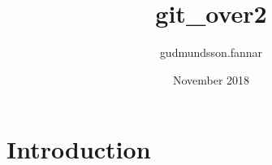 \documentclass{article}
\title{git_over2}
\author{gudmundsson.fannar }
\date{November 2018}
\begin{document}
\maketitle

\section{Introduction}
\end{document}
